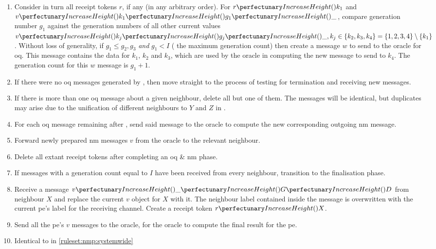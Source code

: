 \begin{enumerate}
    \item Consider in turn all receipt tokens \(r\), if any (in any arbitrary order). For \(\cpfunc{r}{k_1}\) and \(\cpvv{k_1}{g_1}{\cpdiscard}\), compare generation number \(g_1\) against the generation numbers of all other current values \(\cpvv{k_j}{g_j}{\cpdiscard}, k_j \in \{k_2, k_3, k_4\} = \{1, 2, 3, 4\} \setminus \{k_1\}\). Without loss of generality, if \(g_1 \leq g_2, g_3\) \emph{and} \(g_1 < I\) (\ie{} the maximum generation count) then create a message \(w\) to send to the oracle for \gls{oq}.  This message contains the data for \(k_1\), \(k_2\) and \(k_3\), which are used by the oracle in computing the new message to send to \(k_4\).  The generation count for this \(w\) message is \(g_1 + 1\).
    \item If there were no \gls{oq} messages generated by , then move straight to the process of testing for termination and receiving new messages.
    \item If there is more than one \gls{oq} message about a given neighbour, delete all but one of them.  The messages will be identical, but duplicates may arise due to the unification of different neighbours to \(Y\) and \(Z\) in .
    \item For each \gls{oq} message remaining after , send said message to the oracle to compute the new corresponding outgoing \gls{nm} message.
    \item Forward newly prepared \gls{nm} messages \(v\) from the oracle to the relevant neighbour.
    \item Delete all extant receipt tokens after completing an \gls{oq} \& \gls{nm} phase.
    \item If messages with a generation count equal to \(I\) have been received from every neighbour, transition to the finalisation phase.
    \item Receive a message \(\cpvv{\cpdiscard}{G}{D}\) from neighbour \(X\) and replace the current \(v\) object for \(X\) with it.  The neighbour label contained inside the message is overwritten with the current \gls{pe}'s label for the receiving channel.  Create a receipt token \(\cpfunc{r}{X}\).
    \item Send all the \gls{pe}'s \(v\) messages to the oracle, for the oracle to compute the final result for the \gls{pe}.
    \item Identical to  in \cref{ruleset:nmp:systemwide}
\end{enumerate}

